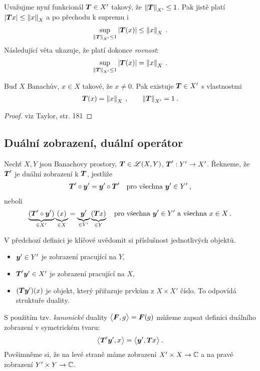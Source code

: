 Uvažujme nyní funkcionál $\boldsymbol{T} \in X'$ takový, že $\left\lVert\boldsymbol{T}\right\rVert_{X'} \leq 1$. Pak jistě platí $|\boldsymbol{T} x| \leq \left\lVert x\right\rVert_X$ a po přechodu k supremu i
\begin{align*}
    \sup_{\left\lVert\boldsymbol{T}\right\rVert_{X'} \leq 1} |\boldsymbol{T}(x)| \leq \left\lVert x\right\rVert_X \:.
\end{align*}
Následující věta ukazuje, že platí dokonce \textit{rovnost}: \begin{align*}
    \sup_{\left\lVert\boldsymbol{T}\right\rVert_{X'} \leq 1} |\boldsymbol{T}(x)| = \left\lVert x\right\rVert_X \:.
\end{align*}

\begin{theorem}
Buď $X$ Banachův, $x \in X$ takové, že $x \neq 0$. Pak existuje $\boldsymbol{T} \in X'$ s vlastnostmi \begin{align*}
    \boldsymbol{T}(x) = \left\lVert x\right\rVert_X \:, \qquad \left\lVert\boldsymbol{T}\right\rVert_{X'} = 1 \:.
\end{align*}
\end{theorem}
\begin{proof}
viz Taylor, str. 181
\end{proof}

\subsection{Duální zobrazení, duální operátor}

\begin{definition}
Nechť $X,Y$ jsou Banachovy prostory, $\boldsymbol{T} \in \mathscr{L} (X,Y)$, $\boldsymbol{T}' : Y' \to X'$. Řekneme, že $\boldsymbol{T}'$ je duální zobrazení k $\boldsymbol{T}$, jestliže \begin{align*}
    \boldsymbol{T}' \circ \boldsymbol{y}' = \boldsymbol{y}' \circ \boldsymbol{T}' \quad \text{pro všechna } \boldsymbol{y}' \in Y' \:,
\end{align*}
neboli \begin{align*}
    \underbrace{(\boldsymbol{T}' \circ \boldsymbol{y}')}_{\in X'} \underbrace{(x)}_{\in X} = \underbrace{\boldsymbol{y}'}_{\in Y'} \underbrace{(\boldsymbol{T} x)}_{\in Y} \quad \text{pro všechna } \boldsymbol{y}' \in Y' \text{ a všechna } x \in X \:.
\end{align*}
\end{definition}

V předchozí definici je klíčové uvědomit si příslušnost jednotlivých objektů. \begin{itemize}
    \item $\boldsymbol{y}' \in Y'$ je zobrazení pracující na $Y$,
    \item $\boldsymbol{T}' \boldsymbol{y}' \in X'$ je zobrazení pracující na $X$,
    \item $(\boldsymbol{T} \boldsymbol{y}')(x)$ je objekt, který přiřazuje prvkům z $X \times X'$ číslo. To odpovídá struktuře duality.
\end{itemize}
S použitím tzv. \textit{kanonické} duality $\big< \boldsymbol{F}, g \big> = \boldsymbol{F}(g)$ můžeme zapsat definici duálního zobrazení v symetrickém tvaru:
\begin{align*}
    \big< \boldsymbol{T}' \boldsymbol{y}', x \big> = \big< \boldsymbol{y}', \boldsymbol{T} x \big> \: .
\end{align*}
Povšimněme si, že na levé straně máme zobrazení $X' \times X \to \mathbb{C}$ a na pravé zobrazení $Y' \times Y \to \mathbb{C}$.


